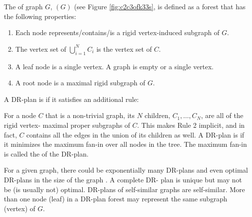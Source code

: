 %
\begin{definition}\label{def:drp}
    The  of graph
    $G$, $(G)$ (see Figure \ref{fig:c2c3ofk33s}, is defined as a forest that has the
    following properties:
    \begin{enumerate}
        \item Each node represents/contains/is a rigid vertex-induced
        subgraph of $G$.
        \item The vertex set of $\bigcup_{i=1}^N{C_i}$ is the vertex
        set of $C$.
        \item A leaf node is a single vertex.
A  graph is empty or a single vertex.
        \item A root node is a maximal rigid subgraph of $G$.
    \end{enumerate}
%
%
    A DR-plan is  if it satisfies an additional rule:
        \item For a node $C$ that is  a non-trivial graph, its $N$
        children, $C_1, \ldots, C_N$, are all of the rigid vertex-
        maximal proper subgraphs of $C$. This makes Rule 2 implicit,
        and in fact, $C$ contains all the edges in the union of its
        children as well.
    A DR-plan is  if it minimizes the maximum fan-in over all nodes in the tree.
    The maximum  fan-in is called the  of the DR-plan.
%
\end{definition}
%
\begin{remark}
    For a given graph, there could be exponentially many  DR-plans and
    even optimal DR-plans in the size of the graph . A complete DR-
    plan is unique but may not be (is usually not) optimal. DR-plans
    of self-similar graphs are self-similar. More than one node (leaf)
    in a DR-plan forest may represent the same subgraph (vertex) of
    $G$.
\end{remark}

